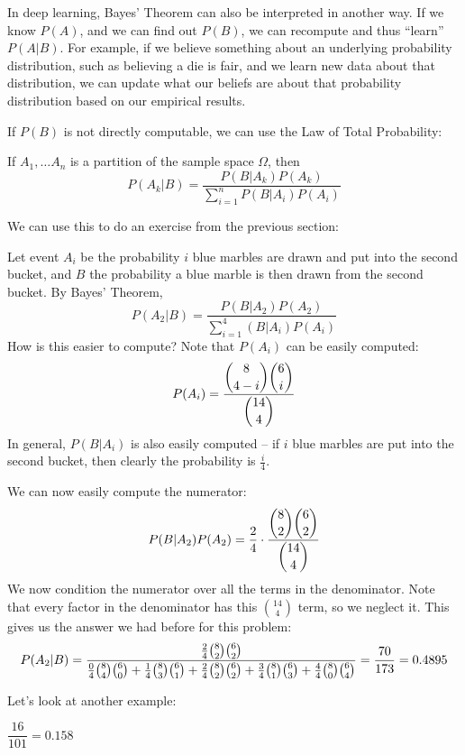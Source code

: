 \documentclass[../main.tex]{subfiles}
\begin{document}
In deep learning, Bayes' Theorem can also be interpreted in another way. If we know $P(A)$, and we can find out $P(B)$, we can recompute and thus ``learn'' $P(A|B)$. For example, if we believe something about an underlying probability distribution, such as believing a die is fair,  and we learn new data about that distribution, we can update what our beliefs are about that probability distribution based on our empirical results. 

If $P(B)$ is not directly computable, we can use the Law of Total Probability: 
\begin{corollary}
If $A_1, \ldots A_n$ is a partition of the sample space $\Omega$, then 
\[
	P(A_k|B) = \frac{P(B|A_k) P(A_k)}{\sum_{i=1}^n P(B|A_i) P(A_i)}
\]
\end{corollary}

We can use this to do an exercise from the previous section: 
\begin{solution} %
Let event $A_i$ be the probability $i$ blue marbles are drawn and put into the second bucket, and $B$ the probability a blue marble is then drawn from the second bucket. By Bayes' Theorem,
\[
	P(A_2|B) = \frac{P(B|A_2) P(A_2)}{\sum_{i=1}^4 (B|A_i) P(A_i)}
\]
How is this easier to compute? Note that $P(A_i)$ can be easily computed: 
\[
	P(A_i) = \frac{\dbinom{8}{4-i} \dbinom{6}{i}}{\dbinom{14}{4}}
\]
In general, $P(B|A_i)$ is also easily computed -- if $i$ blue marbles are put into the second bucket, then clearly the probability is $\frac{i}{4}$. 

We can now easily compute the numerator: 
\[
	P(B|A_2) P(A_2) = \frac{2}{4} \cdot \frac{\dbinom{8}{2} \dbinom{6}{2}}{\dbinom{14}{4}}
\]
We now condition the numerator over all the terms in the denominator. Note that every factor in the denominator has this $\binom{14}{4}$  term, so we neglect it. This gives us the answer we had before for this problem: 
\[
	P(A_2|B) = \frac{\frac{2}{4}\tbinom{8}{2} \tbinom{6}{2}}{\frac{0}{4}\tbinom{8}{4} \tbinom{6}{0} + \frac{1}{4}\tbinom{8}{3} \tbinom{6}{1} + \frac{2}{4}\tbinom{8}{2} \tbinom{6}{2} + \frac{3}{4}\tbinom{8}{1} \tbinom{6}{3} + \frac{4}{4}\tbinom{8}{0} \tbinom{6}{4}} = \frac{70}{173} = 0.4895
\]
\end{solution}
Let's look at another example:
\begin{example}
\end{example}
\begin{solution}[Answer.]
$\dfrac{16}{101} = 0.158$
\end{solution}
\end{document}

